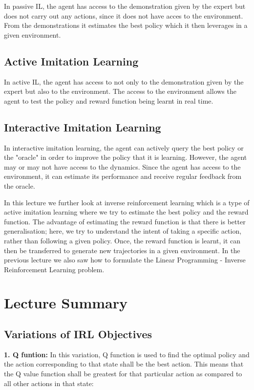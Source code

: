 \documentclass[11pt]{article}
\begin{document}
In passive IL, the agent has access to the demonstration given by the expert but does not carry out any actions, since it does not have acces to the environment. From the demonstrations it estimates the best policy which it then leverages in a given environment.

\subsection{Active Imitation Learning}

In active IL, the agent has access to not only to the demonstration given by the expert but also to the environment. The access to the environment allows the agent to test the policy and reward function being learnt in real time.

\subsection{Interactive Imitation Learning}

In interactive imitation learning, the agent can actively query the best policy or the "oracle" in order to improve the policy that it is learning. However, the agent may or may not have access to the dynamics. Since the agent has access to the environment, it can estimate its performance and receive regular feedback from the oracle.


In this lecture we further look at inverse reinforcement learning which is a type of active imitation learning where we try to estimate the best policy and the reward function. The advantage of estimating the reward function is that there is better generalisation; here, we try to understand the intent of taking a specific action, rather than following a given policy. Once, the reward function is learnt, it can then be transferred to generate new trajectories in a given environment. In the previous lecture we also saw how to formulate the Linear Programming - Inverse Reinforcement Learning problem. 

\section{Lecture Summary}

\subsection{Variations of IRL Objectives}

\textbf{1. Q funtion:} In this variation, Q function is used to find the optimal policy and the action corresponding to that state shall be the best action. This means that the Q value function shall be greatest for that particular action as compared to all other actions in that state:
\end{document}
